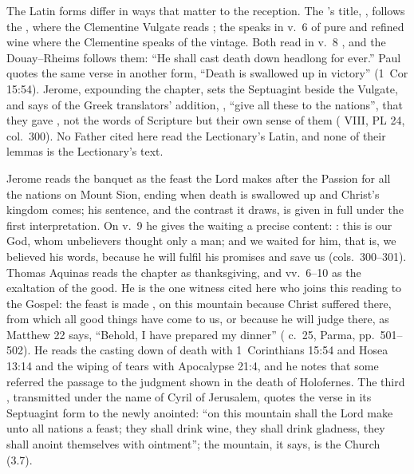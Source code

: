 The Latin forms differ in ways that matter to the reception. The 's
title, , follows the , where the
Clementine Vulgate reads ; the  speaks in v.~6
of pure and refined wine where the Clementine speaks of the vintage. Both read
in v.~8 , and the Douay--Rheims
follows them: ``He shall cast death down headlong for ever.'' Paul quotes the
same verse in another form, ``Death is swallowed up in victory'' (1~Cor 15:54).
Jerome, expounding the chapter, sets the Septuagint beside the Vulgate, and
says of the Greek translators' addition, ,
``give all these to the nations'', that they gave , not the words of Scripture but their own sense of them
( VIII, PL 24, col.~300). No Father cited here read
the Lectionary's Latin, and none of their lemmas is the Lectionary's text.

Jerome reads the banquet as the feast the Lord makes after the Passion for all
the nations on Mount Sion, ending when death is swallowed up and Christ's
kingdom comes; his sentence, and the contrast it draws, is given in full under
the first interpretation. On v.~9 he gives the waiting a precise content:
: this is our God, whom unbelievers thought only a man; and we
waited for him, that is, we believed his words, because he will fulfil his
promises and save us (cols.~300--301). Thomas Aquinas reads the chapter as
thanksgiving, and vv.~6--10 as the exaltation of the good. He is the one
witness cited here who joins this reading to the Gospel: the feast is made
, on this mountain because Christ suffered there, from which all good
things have come to us, or because he will judge there, as Matthew 22 says,
``Behold, I have prepared my dinner'' ( c.~25,
Parma, pp.~501--502). He reads the casting down of death with 1~Corinthians
15:54 and Hosea 13:14 and the wiping of tears with Apocalypse 21:4, and he
notes that some referred the passage to the judgment shown in the death of
Holofernes. The third , transmitted under the name
of Cyril of Jerusalem, quotes the verse in its Septuagint form to the newly
anointed: ``on this mountain shall the Lord make unto all nations a feast; they
shall drink wine, they shall drink gladness, they shall anoint themselves with
ointment''; the mountain, it says, is the Church (3.7).

